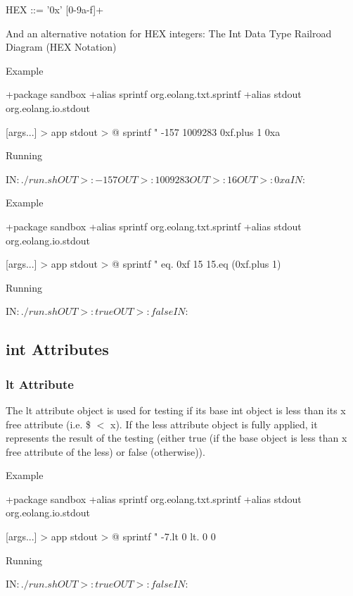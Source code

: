 \documentclass[12pt]{book}
\begin{document}
\begin{ffcode}
HEX      ::= '0x' [0-9a-f]+
\end{ffcode}


And an alternative notation for HEX integers:
The Int Data Type Railroad Diagram (HEX Notation)

Example
\begin{ffcode}
+package sandbox
+alias sprintf org.eolang.txt.sprintf
+alias stdout org.eolang.io.stdout

[args...] > app
  stdout > @
    sprintf
      "%
      -157
      1009283
      0xf.plus 1
      0xa

Running

IN$: ./run.sh
OUT>: -157
OUT>: 1009283
OUT>: 16
OUT>: 0xa
IN$: 
\end{ffcode}

Example
\begin{ffcode}
+package sandbox
+alias sprintf org.eolang.txt.sprintf
+alias stdout org.eolang.io.stdout
    
[args...] > app
  stdout > @
  sprintf
    "%
    eq.
      0xf
      15
    15.eq (0xf.plus 1)
    
Running

IN$: ./run.sh
OUT>: true
OUT>: false
IN$: 
\end{ffcode}

\subsection{int Attributes}

\subsubsection{lt Attribute}
The lt attribute object is used for testing if its base int object is less than its x free attribute (i.e. \$ $<$ x).
If the less attribute object is fully applied, it represents the result of the testing (either true (if the base object is less than x free attribute of the less) or false (otherwise)).

Example
\begin{ffcode}
+package sandbox
+alias sprintf org.eolang.txt.sprintf
+alias stdout org.eolang.io.stdout

[args...] > app
  stdout > @
    sprintf
      "%
      -7.lt 0
      lt.
        0
        0

Running

IN$: ./run.sh
OUT>: true
OUT>: false
IN$: 
\end{ffcode}
\end{document}
